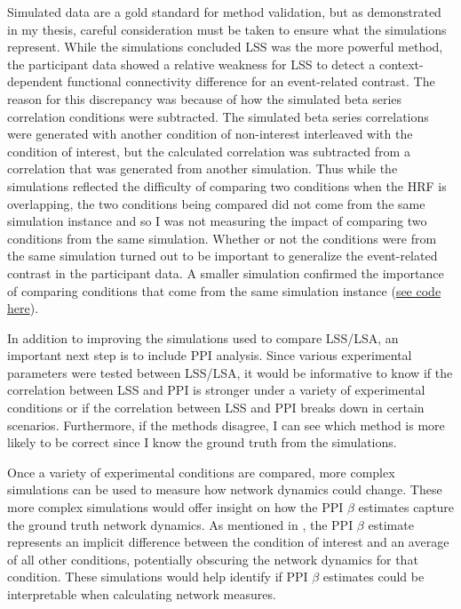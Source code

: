 \documentclass[phd,figures,tables,ackpage,abstractpage,publicabstractpage]{uithesis}
\begin{document}
Simulated data are a gold standard for method validation, but as demonstrated in my
thesis, careful consideration must be taken to ensure what the simulations represent.
While the simulations concluded LSS was the more powerful method, the 
participant data showed a relative weakness for LSS to detect a
context-dependent functional connectivity difference for an
event-related contrast.
The reason for this discrepancy was because of how the simulated
beta series correlation conditions were subtracted.
The simulated beta series correlations were generated with another condition
of non-interest interleaved with the condition of interest, but the calculated
correlation was subtracted from a correlation that was
generated from another simulation.
Thus while the simulations reflected the difficulty of comparing two conditions
when the HRF is overlapping, the two conditions being compared did not come
from the same simulation instance and so I was not measuring the impact
of comparing two conditions from the same simulation.
Whether or not the conditions were from the same simulation
turned out to be important to generalize the event-related contrast
in the participant data.
A smaller simulation confirmed the importance of comparing conditions
that come from the same simulation instance
(\href{https://github.com/jdkent/BetaSeriesRealDataAnalysis/blob/49e95ff36721abc66fde67202a34866979af0954/nibsAnalysis/investigate_induced_correlations.ipynb}{see code here}).

In addition to improving the simulations used to compare LSS/LSA,
an important next step is to include PPI analysis.
Since various experimental parameters were tested between LSS/LSA,
it would be informative to know if the correlation between LSS and PPI
is stronger under a variety of experimental conditions or if
the correlation between LSS and PPI breaks down in certain scenarios.
Furthermore, if the methods disagree, I can see which method
is more likely to be correct since I know the ground truth from
the simulations.

Once a variety of experimental conditions are compared, more complex
simulations can be used to measure how network dynamics could change.
These more complex simulations would offer insight on how the PPI
$\beta$ estimates capture the ground truth network dynamics.
As mentioned in , the PPI $\beta$ estimate
represents an implicit difference between the condition of interest
and an average of all other conditions, potentially obscuring the network
dynamics for that condition.
These simulations would help identify if PPI $\beta$ estimates could be
interpretable when calculating network measures.
\end{document}
